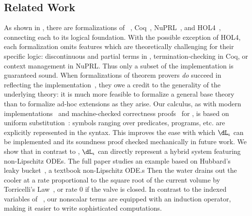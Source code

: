 \documentclass[12pt]{cmuthesis}
\theoremstyle{definition}
\theoremstyle{remark}
\newcommand{\rref}[2][]{\prettyref{#2}}
\newcommand{\dLi}{\ensuremath{\dL_\iota}\xspace}
\begin{document}
\subsection{Related Work}
As shown in \rref{fig:prover-formalizations}, there are formalizations of \KeYmaeraX~\cite{DBLP:conf/pldi/BohrerTMMP18}, Coq~\cite{DBLP:journals/jfrea/Barras10}, NuPRL~\cite{DBLP:conf/itp/AnandR14}, and HOL4~\cite{DBLP:journals/jar/KumarAMO16}, connecting each to its logical foundation.
With the possible exception of HOL4, each formalization omits features which are theoretically challenging for their specific logic: discontinuous and partial terms in \KeYmaeraX, termination-checking in Coq, or context management in NuPRL.
Thus only a subset of the implementation is guaranteed sound.
When formalizations of theorem provers \emph{do} succeed in reflecting the implementation~\cite{DBLP:journals/jar/KumarAMO16}, they owe a credit to the generality of the underlying theory: it is much more feasible to formalize a general base theory than to formalize ad-hoc extensions as they arise.
Our calculus, as with modern implementations~\cite{DBLP:conf/cade/FultonMQVP15} and machine-checked correctness proofs~\cite{DBLP:conf/cpp/BohrerRVVP17} for \dL, is based on uniform substitution~\cite[\S35,\S40]{Church:1956}: symbols ranging over predicates, programs, etc. are explicitly represented in the syntax.
This improves the ease with which \dLi can be implemented and its soundness proof checked mechanically in future work.
We show that in contrast to \dL, \dLi can directly represent a hybrid system featuring non-Lipschitz ODEs.
The full paper studies an example based on Hubbard's leaky bucket~\cite[\S4.2]{Hubbard}, a textbook non-Lipschitz ODE.s
Then the water drains out the cooler at a rate proportional to the square root of the current volume  by Torricelli's Law~\cite{driver1998torricelli}, or rate 0 if the valve is closed.
In contrast to the indexed variables of \QdL~\cite{DBLP:journals/lmcs/Platzer12b}, our nonscalar terms are equipped with an induction operator, making it easier to write sophisticated computations.
%
\newcommand{\circsize}{0.3in}
\end{document}
